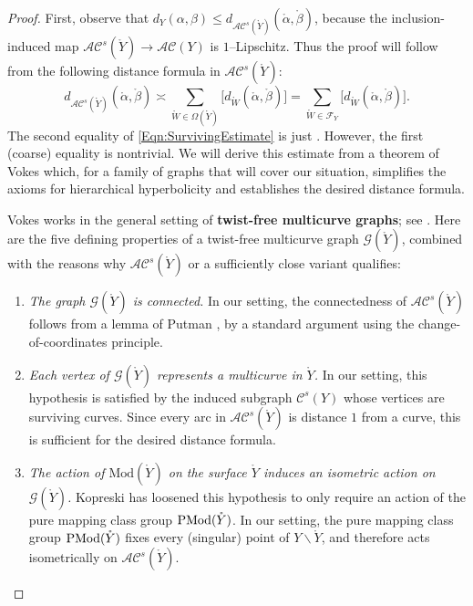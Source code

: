 \documentclass[11pt,letterpaper]{amsart}
\newcommand{\mc}{\mathcal}
\newcommand{\mr}{\mathring}
\newcommand{\psub}{\mr W}
\numberwithin{equation}{section}
\theoremstyle{definition}
\newcommand{\C}{\mathcal{C}}
\newcommand{\Mod}{\mathrm{Mod}}
\newcommand{\define}[1]{\textbf{#1}}
\renewcommand{\setminus}{\smallsetminus}
\newcommand{\AC}{\mathcal{AC}}
\begin{document}
\begin{proof}
First, observe that $d_{Y} (\alpha,  \beta) \leq d_{\AC^s(\mr Y)} (\mr \alpha, \mr \beta)$, because the inclusion-induced map $\AC^s(\mr Y) \to \AC(Y)$ is $1$--Lipschitz. Thus the proof will follow from the following distance formula in $\AC^s(\mr Y)$:
\begin{equation}\label{Eqn:SurvivingEstimate}
d_{\AC^s(\mr Y)} (\mr \alpha, \mr \beta) \asymp \sum_{\psub \in \Omega(\mr Y)} \big[ d_{\psub}(\mr \alpha, \mr \beta) \big] 
 = \sum_{\psub \in \mc F_Y} \big[ d_{\psub}(\mr \alpha, \mr \beta) \big] .
\end{equation}
The second equality of \eqref{Eqn:SurvivingEstimate} is just . However, the first (coarse) equality is nontrivial. We will derive this estimate from a theorem of Vokes \cite[Corollary 1.2]{Vokes} which, for a family of graphs that will cover our situation, simplifies the axioms for hierarchical hyperbolicity and establishes the desired distance formula.

Vokes works in the general setting of \define{twist-free multicurve graphs}; see \cite[Definition 2.1]{Vokes}. 
Here are the five defining properties of a twist-free multicurve graph $\mc G(\mr Y)$, combined with the reasons why $\AC^s(\mr Y)$ or a sufficiently close variant qualifies:
\begin{enumerate}
\item \emph{The graph $\mc G(\mr Y)$ is connected.} In our setting, the connectedness of $\AC^s(\mr Y)$ follows 
from a lemma of Putman \cite[Lemma 2.1]{Putman}, by a standard argument 
using the change-of-coordinates principle.

\smallskip
\item \emph{Each vertex of $\mc G(\mr Y)$ represents a multicurve in $\mr Y$.} In our setting, this hypothesis is satisfied by the induced subgraph $\C^s(Y)$ whose vertices are surviving curves. Since every arc in $\AC^s(\mr Y)$ is distance $1$ from a curve, this is sufficient for the desired distance formula.

\smallskip
\item \emph{The action of $\Mod(\mr Y)$ on the surface $\mr Y$ induces an isometric action on $\mc G(\mr Y)$.} Kopreski \cite{Kopreski} has loosened this hypothesis to only require an action of the pure mapping class group $\textup{P}\Mod(\mr Y)$. In our setting, the pure mapping class group $\textup{P}\Mod(\mr Y)$ fixes every (singular) point of $Y \setminus \mr Y$, and therefore acts isometrically on $\AC^s(\mr Y)$.


\end{enumerate}
\end{proof}
\end{document}
